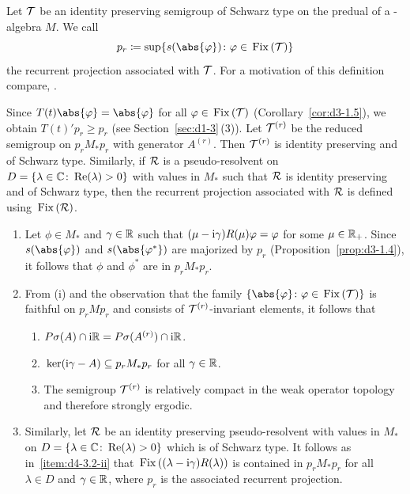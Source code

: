 Let $\mathcal{T}$ be an identity preserving semigroup of Schwarz type on the predual of a \WA-algebra $M$.
We call
\[
p_{r} \coloneqq \sup\{s(\abs{\phi}) \colon \phi \in \Fix{\TT}\}
\]
the recurrent projection associated with $\mathcal{T}$.
For a motivation of this definition compare, \eg \textcite[Section 6.3]{davies:1976}.

Since $T(t)\abs{\phi} = \abs{\phi}$ for all $\phi \in \Fix{\TT}$ (Corollary~\ref{cor:d3-1.5}), we obtain $T(t)'p_{r} \geq p_{r}$ (see Section~\ref{sec:d1-3}\,(3)).
Let $\mathcal{T}^{(r)}$ be the reduced semigroup on $p_{r}M_{*}p_{r}$ with generator $A^{(r)}$.
Then $\mathcal{T}^{(r)}$ is identity preserving and of Schwarz type.
Similarly, if\/ $\mathcal{R}$ is a pseudo-resolvent 
on $D = \{\lambda \in \mathbb{C} \colon \mathop{}\!\mathrm{Re}(\lambda) > 0\}$ with values in $M_{*}$ such that $\mathcal{R}$ is identity preserving and of Schwarz type, then the recurrent projection associated with $\mathcal{R}$ is defined using $\mathop{}\mathrm{Fix}\left(\mathcal{R}\right)$.
\begin{remark}\label{rem:d4-3.2}
\begin{enumerate}[\upshape (i), wide, labelindent=.25em]

\item\label{item:d4-3.2-i}
Let $\phi \in M_{*}$ and $\gamma \in \mathbb{R}$ such that $(\mu - \im\gamma)R(\mu)\phi = \phi$ for some $\mu \in \mathbb{R}_{+}$.
Since $s(\abs{\phi})$ and $s(\abs{\phi^{*}})$ are majorized by $p_{r}$ (Proposition~\ref{prop:d3-1.4}), it follows that $\phi$ and $\phi^{*}$ are in $p_{r}M_{*}p_{r}$.

\item\label{item:d4-3.2-ii}
From (i) and the observation that the family $\{\abs{\phi} \colon \phi \in \Fix{\TT}\}$ is
faithful on $p_{r}Mp_{r}$ and consists of\/ $\mathcal{T}^{(r)}$-invariant elements, it follows that
\begin{enumerate}[--]
\item
$P\sigma(A) \cap \mathrm{i}\mathbb{R} = P\sigma(A^{(r)}) \cap \mathrm{i}\mathbb{R}$.

\item
$\mathop{}\mathrm{ker}( \mathrm{i}\gamma - A ) \subseteq p_{r}M_{*}p_{r}$ for all $\gamma \in \mathbb{R}$.

\item
The semigroup $\mathcal{T}^{(r)}$ is relatively compact in the weak operator topology and therefore strongly ergodic.
\end{enumerate}

\item\label{item:d4-3.2-iii}
Similarly, let $\mathcal{R}$ be an identity preserving pseudo-resolvent with values in $M_{*}$ on $D = \{\lambda \in \mathbb{C} \colon \mathop{}\!\mathrm{Re}(\lambda) > 0\}$ which is of Schwarz type.
It follows as in~\ref{item:d4-3.2-ii} that 
$\mathop{}\mathrm{Fix}\left((\lambda - \mathrm{i}\gamma)R(\lambda)\right)$ 
is contained in $p_{r}M_{*}p_{r}$ for all $\lambda \in D$ and $\gamma \in \mathbb{R}$, where $p_{r}$ is the associated recurrent projection.
\end{enumerate}
\end{remark}
